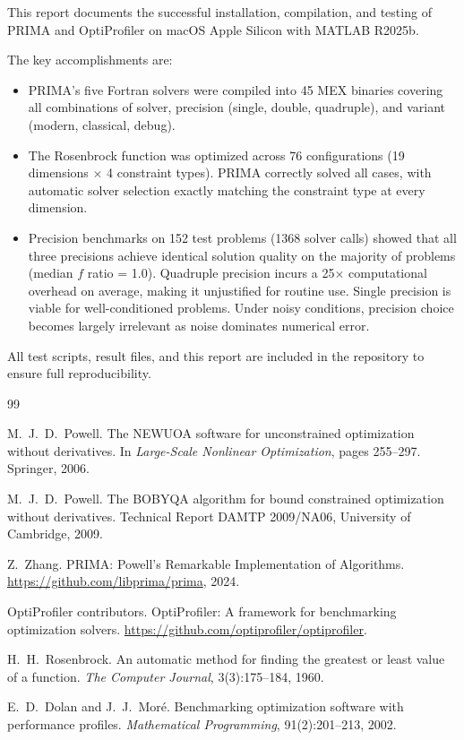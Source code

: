 \documentclass[11pt,a4paper]{article}
\begin{document}
This report documents the successful installation, compilation, and testing
of PRIMA and OptiProfiler on macOS Apple Silicon with MATLAB R2025b.

The key accomplishments are:

\begin{itemize}
    \item PRIMA's five Fortran solvers were compiled into 45 MEX binaries
          covering all combinations of solver, precision (single, double,
          quadruple), and variant (modern, classical, debug).
    \item The Rosenbrock function was optimized across 76 configurations
          (19 dimensions $\times$ 4 constraint types). PRIMA correctly solved
          all cases, with automatic solver selection exactly matching the
          constraint type at every dimension.
    \item Precision benchmarks on 152 test problems (1368 solver calls) showed
          that all three precisions achieve identical solution quality on the
          majority of problems (median $f$ ratio = 1.0). Quadruple precision
          incurs a 25$\times$ computational overhead on average, making it
          unjustified for routine use. Single precision is viable for
          well-conditioned problems. Under noisy conditions, precision choice
          becomes largely irrelevant as noise dominates numerical error.
\end{itemize}

All test scripts, result files, and this report are included in the repository
to ensure full reproducibility.


\begin{thebibliography}{99}

M.~J.~D.~Powell.
The NEWUOA software for unconstrained optimization without derivatives.
In \emph{Large-Scale Nonlinear Optimization}, pages 255--297. Springer, 2006.

M.~J.~D.~Powell.
The BOBYQA algorithm for bound constrained optimization without derivatives.
Technical Report DAMTP 2009/NA06, University of Cambridge, 2009.

Z.~Zhang.
PRIMA: Powell's Remarkable Implementation of Algorithms.
\url{https://github.com/libprima/prima}, 2024.

OptiProfiler contributors.
OptiProfiler: A framework for benchmarking optimization solvers.
\url{https://github.com/optiprofiler/optiprofiler}.

H.~H.~Rosenbrock.
An automatic method for finding the greatest or least value of a function.
\emph{The Computer Journal}, 3(3):175--184, 1960.

E.~D.~Dolan and J.~J.~Mor\'{e}.
Benchmarking optimization software with performance profiles.
\emph{Mathematical Programming}, 91(2):201--213, 2002.

\end{thebibliography}
\end{document}
